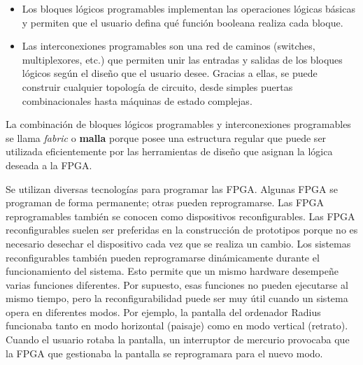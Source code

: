 \begin{itemize}
    \item Los bloques lógicos programables implementan las operaciones lógicas básicas y permiten que el usuario defina qué función booleana realiza cada bloque.

    \item Las interconexiones programables son una red de caminos (switches, multiplexores, etc.) que permiten unir las entradas y salidas de los bloques lógicos según el diseño que el usuario desee. Gracias a ellas, se puede construir cualquier topología de circuito, desde simples puertas combinacionales hasta máquinas de estado complejas.
\end{itemize}
La combinación de bloques lógicos programables y interconexiones programables se llama \textit{fabric} o \textbf{malla} porque posee una estructura regular que puede ser utilizada eficientemente por las herramientas de diseño que asignan la lógica deseada a la FPGA.

Se utilizan diversas tecnologías para programar las FPGA. Algunas FPGA se programan de forma permanente; otras pueden reprogramarse. Las FPGA reprogramables también se conocen como dispositivos reconfigurables. Las FPGA reconfigurables suelen ser preferidas en la construcción de prototipos porque no es necesario desechar el dispositivo cada vez que se realiza un cambio. Los sistemas reconfigurables también pueden reprogramarse dinámicamente durante el funcionamiento del sistema. Esto permite que un mismo hardware desempeñe varias funciones diferentes. Por supuesto, esas funciones no pueden ejecutarse al mismo tiempo, pero la reconfigurabilidad puede ser muy útil cuando un sistema opera en diferentes modos. Por ejemplo, la pantalla del ordenador Radius funcionaba tanto en modo horizontal (paisaje) como en modo vertical (retrato). Cuando el usuario rotaba la pantalla, un interruptor de mercurio provocaba que la FPGA que gestionaba la pantalla se reprogramara para el nuevo modo.


